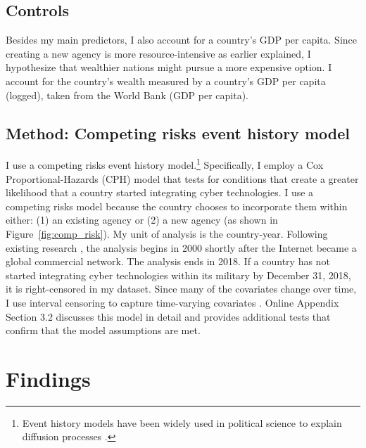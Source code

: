 \documentclass[12pt, letterpaper]{article}
\renewcommand{\baselinestretch}{1.35}
\let\oldfootnote\footnote
\renewcommand\footnote[1]{\oldfootnote{%
		\renewcommand\baselinestretch{.8}%
		\large\footnotesize\ignorespaces#1}} \addtolength{\footnotesep}{3pt}
\theoremstyle{plain}
\theoremstyle{remark}
\begin{document}
\subsection*{Controls}


\noindent
Besides my main predictors, I also account for a country's GDP per capita.
Since creating a new agency is more resource-intensive as earlier explained, I hypothesize that wealthier nations might pursue a more expensive option. I account for the country’s wealth measured by a country’s GDP per capita (logged), taken from the World Bank (GDP per capita).


\subsection*{Method: Competing risks event history model}

\noindent
I use a competing risks event history model.\footnote{
	Event history models have been widely used in political science to explain diffusion processes \citep{Berry1990APSR,Elkins2006IO,Simmons2004APSR,Simmons2018IO}.
	} 
Specifically, I employ a Cox Proportional-Hazards (CPH) model that tests for conditions that create a greater likelihood that a country started integrating cyber technologies. 
I use a competing risks model because the country chooses to incorporate them within either: (1) an existing agency or (2) a new agency (as shown in Figure~\ref{fig:comp_risk}).   
My unit of analysis is the country-year.
Following existing
research \citep{Blessing2020}, the analysis begins in 2000 shortly after the Internet became
a global commercial network.
The analysis ends in 2018.
If a country has not started integrating cyber technologies within its military by December 31, 2018, it is right-censored in my dataset. 
Since many of the covariates change over time, I use interval censoring to capture time-varying covariates \citep{Therneau2000}.
Online Appendix Section 3.2 discusses this model in detail and provides additional tests that confirm that the model assumptions are met.

	

\section*{Findings}\label{sec:results}
\end{document}
